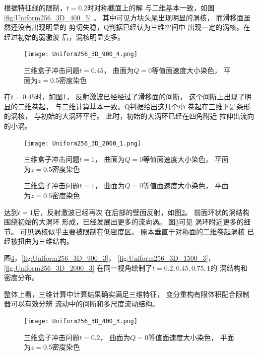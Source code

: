 \documentclass[UTF8,zihao=5]{ctexart} %
\begin{document}
根据特征线的限制，$t=0.2$时对称截面上的解
与二维基本一致，如图
\ref{fig:Uniform256_3D_400_5}
。
其中可见方块头尾出现明显的涡核，
而滑移面虽然还没有出现明显的
剪切失稳，Q判据已经认为三维空间中
出现一定的涡核。在经过初始的弱激波
后，涡核明显变多。

\begin{figure}[htbp]
    \centering
    \texttt{[image: Uniform256\_3D\_900\_4.png]}  %
    \caption{三维盒子冲击问题$t=0.45$，
        曲面为$Q=0$等值面速度大小染色，
        平面为$z=0.5$密度染色}
    \label{fig:Uniform256_3D_900_4}
\end{figure}

在$t=0.45$时，如图\ref{fig:Uniform256_3D_900_4}，
反射激波已经经过了滑移面的间断，
这个间断上出现了明显的二维卷起，
与二维计算基本一致。Q判据给出这几个小
卷起在三维下是条形的涡核，
与初始的大涡环平行。
此时，初始的大涡环已经在四角附近
拉伸出流向的小涡。


\begin{figure}[htbp]
    \centering
    \texttt{[image: Uniform256\_3D\_2000\_1.png]}  %
    \caption{三维盒子冲击问题$t=1$，
        曲面为$Q=0$等值面速度大小染色，
        平面为$z=0.5$密度染色}
    \label{fig:Uniform256_3D_2000_1}
\end{figure}

\begin{figure}[htbp]
    \centering
    \caption{三维盒子冲击问题$t=1$，
        曲面为$Q=0$等值面速度大小染色，
        平面为$z=0.5$密度染色}
    \label{fig:Uniform256_3D_2000_2}
\end{figure}

达到$t=1$后，反射激波已经再次
在后部的壁面反射，如图\ref{fig:Uniform256_3D_2000_1}。
前面环状的涡结构围绕初始的大涡环
形成，已经发展出更多的流向涡。
图\ref{fig:Uniform256_3D_2000_2}可见
涡环附近更多的细节。
可见涡核似乎主要被限制在低密度区。
原本垂直于对称面的二维卷起涡核
已经被扭曲为三维结构。

图\ref{fig:Uniform256_3D_400_3}，\ref{fig:Uniform256_3D_900_3}，
\ref{fig:Uniform256_3D_1500_3}，\ref{fig:Uniform256_3D_2000_3}
在同一视角绘制了$t=0.2,0.45,0.75,1$的
涡结构和密度分布。

整体上看，三维计算中计算结果确实满足三维特征，
变分重构有限体积配合限制器可以有效分辨
流动中的间断和多尺度流动结构。



\begin{figure}[htbp]
    \centering
    \texttt{[image: Uniform256\_3D\_400\_3.png]}  %
    \caption{三维盒子冲击问题$t=0.2$，
        曲面为$Q=0$等值面速度大小染色，
        平面为$z=0.5$密度染色}
    \label{fig:Uniform256_3D_400_3}
\end{figure}
\end{document}
